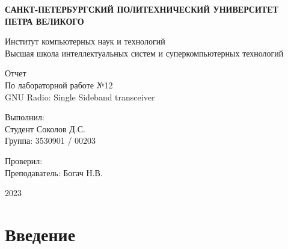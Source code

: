 \documentclass{article}
\begin{document}
\begin{titlepage}
	\newpage
    \begin{center}
    {\bfseries САНКТ-ПЕТЕРБУРГСКИЙ ПОЛИТЕХНИЧЕСКИЙ УНИВЕРСИТЕТ ПЕТРА ВЕЛИКОГО}
  
	\noindent\makebox[\linewidth]{\rule{\textwidth}{0.4pt}} 

	\vspace{1cm}
	
	Институт компьютерных наук и технологий
	\\
	Высшая школа интеллектуальных систем и суперкомпьютерных технологий


  	\vspace{2cm}
  	
  	Отчет \\
    
  	По лабораторной работе №12 \\
  	\vspace{1em}
  	GNU Radio: Single Sideband transceiver
    
    \vspace{6em}
    
   \end{center}
   
   \vspace{3cm}

   \begin{flushright}
   
	Выполнил: \\
	Студент Соколов Д.С. \\ 
    Группа: 3530901 / 00203 
    
    \vspace{1em}
    
    Проверил: \\
    Преподаватель: Богач Н.В.
   
   \end{flushright}
   
   \vfill
   \begin{center}
   2023   
   \end{center}
	   
   
\end{titlepage}

\tableofcontents


\newpage
\section*{Введение}
\end{document}
